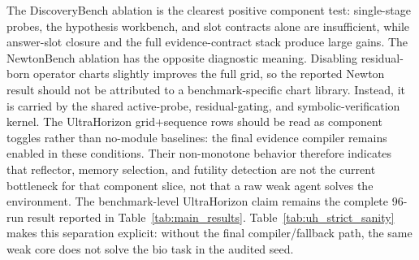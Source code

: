 \documentclass[letterpaper]{article}
\begin{document}
The DiscoveryBench ablation is the clearest positive component test:
single-stage probes, the hypothesis workbench, and slot contracts alone are
insufficient, while answer-slot closure and the full evidence-contract stack
produce large gains. The NewtonBench ablation has the opposite diagnostic
meaning. Disabling residual-born operator charts slightly improves the full
grid, so the reported Newton result should not be attributed to a
benchmark-specific chart library. Instead, it is carried by the shared
active-probe, residual-gating, and symbolic-verification kernel. The
UltraHorizon grid+sequence rows should be read as component toggles rather than
no-module baselines: the final evidence compiler remains enabled in these
conditions. Their non-monotone behavior therefore indicates that reflector,
memory selection, and futility detection are not the current bottleneck for
that component slice, not that a raw weak agent solves the environment. The
benchmark-level UltraHorizon claim remains the complete 96-run result reported
in Table~\ref{tab:main_results}. Table~\ref{tab:uh_strict_sanity} makes this
separation explicit: without the final compiler/fallback path, the same weak
core does not solve the bio task in the audited seed.
\end{document}
